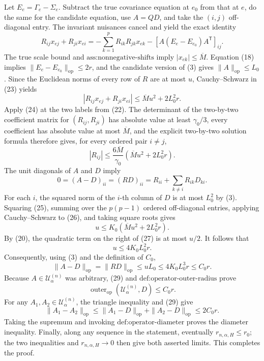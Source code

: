 Let \(E_e=\Gamma_e-\Sigma_e\). Subtract the true covariance equation at \(e_0\) from that at \(e\), do the same for the candidate equation, use \(A=QD\), and take the \((i,j)\) off-diagonal entry. The invariant nuisances cancel and yield the exact identity
\[
R_{ij}x_{ej}+R_{ji}x_{ei}
=-\sum_{k=1}^pR_{ik}R_{jk}x_{ek}
-[A(E_e-E_{e_0})A^{\mathsf T}]_{ij}.
\tag{23}
\]
The true scale bound and \(\text{ass:nonnegative-shifts}\) imply \(|x_{ek}|\leq\overline M\). Equation (18) implies \(\|E_e-E_{e_0}\|_{\mathrm{op}}\leq2r\), and the candidate version of (3) gives \(\|A\|_{\mathrm{op}}\leq L_0\). Since the Euclidean norms of every row of \(R\) are at most \(u\), Cauchy--Schwarz in (23) yields
\[
|R_{ij}x_{ej}+R_{ji}x_{ei}|
\leq\overline M u^2+2L_0^2r.
\tag{24}
\]
Apply (24) at the two labels from (22). The determinant of the two-by-two coefficient matrix for \((R_{ij},R_{ji})\) has absolute value at least \(\gamma_0/3\), every coefficient has absolute value at most \(\overline M\), and the explicit two-by-two solution formula therefore gives, for every ordered pair \(i\neq j\),
\[
|R_{ij}|
\leq\frac{6\overline M}{\gamma_0}
\left(\overline M u^2+2L_0^2r\right).
\tag{25}
\]
The unit diagonals of \(A\) and \(D\) imply
\[
0=(A-D)_{ii}=(RD)_{ii}
=R_{ii}+\sum_{k\neq i}R_{ik}D_{ki}.
\tag{26}
\]
For each \(i\), the squared norm of the \(i\)-th column of \(D\) is at most \(L_0^2\) by (3). Squaring (25), summing over the \(p(p-1)\) ordered off-diagonal entries, applying Cauchy--Schwarz to (26), and taking square roots gives
\[
u\leq K_0\left(\overline M u^2+2L_0^2r\right).
\tag{27}
\]
By (20), the quadratic term on the right of (27) is at most \(u/2\). It follows that
\[
u\leq4K_0L_0^2r.
\tag{28}
\]
Consequently, using (3) and the definition of \(C_0\),
\[
\|A-D\|_{\mathrm{op}}
=\|RD\|_{\mathrm{op}}
\leq uL_0
\leq4K_0L_0^3r
\leq C_0r.
\tag{29}
\]
Because \(A\in\mathcal U^{(n)}_\alpha\) was arbitrary, (29) and \(\text{def:operator-outer-radius}\) prove
\[
\operatorname{outer}_{\mathrm{op}}(\mathcal U^{(n)}_\alpha,D)
\leq C_0r.
\]
For any \(A_1,A_2\in\mathcal U^{(n)}_\alpha\), the triangle inequality and (29) give
\[
\|A_1-A_2\|_{\mathrm{op}}
\leq\|A_1-D\|_{\mathrm{op}}+\|A_2-D\|_{\mathrm{op}}
\leq2C_0r.
\]
Taking the supremum and invoking \(\text{def:operator-diameter}\) proves the diameter inequality. Finally, along any sequence in the statement, eventually \(r_{n,\alpha,H}\leq r_0\); the two inequalities and \(r_{n,\alpha,H}\to0\) then give both asserted limits. This completes the proof.